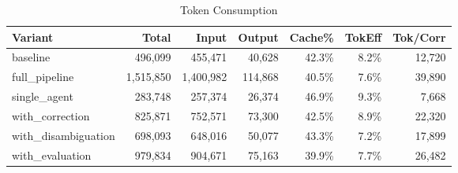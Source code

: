 \begin{table}[htbp]
\centering
\caption{Token Consumption}
\label{tab:tokens}
\begin{tabular}{l rrrr rr}
\toprule
Variant & Total & Input & Output & Cache\% & TokEff & Tok/Corr \\
\midrule
  baseline & 496,099 & 455,471 & 40,628 & 42.3\% & 8.2\% & 12,720 \\
  full\_pipeline & 1,515,850 & 1,400,982 & 114,868 & 40.5\% & 7.6\% & 39,890 \\
  single\_agent & 283,748 & 257,374 & 26,374 & 46.9\% & 9.3\% & 7,668 \\
  with\_correction & 825,871 & 752,571 & 73,300 & 42.5\% & 8.9\% & 22,320 \\
  with\_disambiguation & 698,093 & 648,016 & 50,077 & 43.3\% & 7.2\% & 17,899 \\
  with\_evaluation & 979,834 & 904,671 & 75,163 & 39.9\% & 7.7\% & 26,482 \\
\bottomrule
\end{tabular}
\end{table}
